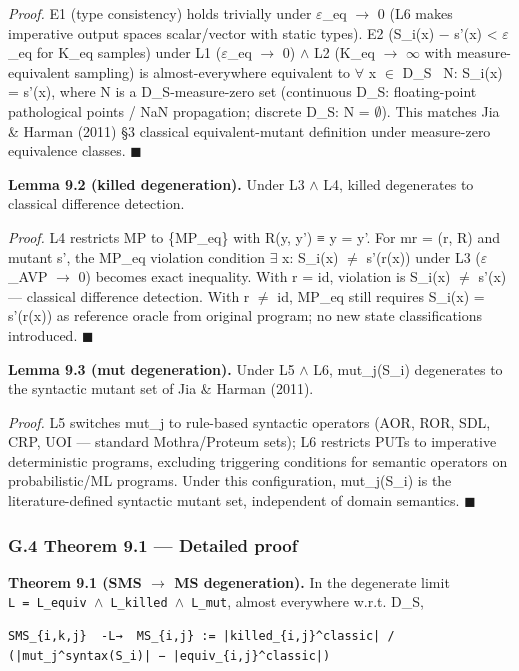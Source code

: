 \documentclass[review,12pt,authoryear]{elsarticle}
\begin{document}
\emph{Proof.} E1 (type consistency) holds trivially under $\varepsilon$\_eq $\to$ 0 (L6
makes imperative output spaces scalar/vector with static types). E2
(\textbar S\_i(x) − s'(x)\textbar{} \textless{} $\varepsilon$\_eq for K\_eq samples)
under L1 ($\varepsilon$\_eq $\to$ 0) $\wedge$ L2 (K\_eq $\to$ $\infty$ with measure-equivalent sampling)
is almost-everywhere equivalent to $\forall$ x $\in$ D\_S ~N: S\_i(x) = s'(x), where
N is a D\_S-measure-zero set (continuous D\_S: floating-point
pathological points / NaN propagation; discrete D\_S: N = $\emptyset$). This
matches Jia \& Harman (2011) §3 classical equivalent-mutant definition
under measure-zero equivalence classes. $\blacksquare$

\textbf{Lemma 9.2 (killed degeneration).} Under L3 $\wedge$ L4, killed
degenerates to classical difference detection.

\emph{Proof.} L4 restricts MP to \{MP\_eq\} with R(y, y') ≡ y = y'. For
mr = (r, R) and mutant s', the MP\_eq violation condition $\exists$ x: S\_i(x) $\neq$
s'(r(x)) under L3 ($\varepsilon$\_AVP $\to$ 0) becomes exact inequality. With r = id,
violation is S\_i(x) $\neq$ s'(x) --- classical difference detection. With r
$\neq$ id, MP\_eq still requires S\_i(x) = s'(r(x)) as reference oracle from
original program; no new state classifications introduced. $\blacksquare$

\textbf{Lemma 9.3 (mut degeneration).} Under L5 $\wedge$ L6, mut\_j(S\_i)
degenerates to the syntactic mutant set of Jia \& Harman (2011).

\emph{Proof.} L5 switches mut\_j to rule-based syntactic operators (AOR,
ROR, SDL, CRP, UOI --- standard Mothra/Proteum sets); L6 restricts PUTs
to imperative deterministic programs, excluding triggering conditions
for semantic operators on probabilistic/ML programs. Under this
configuration, mut\_j(S\_i) is the literature-defined syntactic mutant
set, independent of domain semantics. $\blacksquare$

\subsubsection{G.4 Theorem 9.1 --- Detailed
proof}\label{g.4-theorem-9.1-detailed-proof}

\textbf{Theorem 9.1 (SMS $\to$ MS degeneration).} In the degenerate limit
\texttt{L\ =\ L\_equiv\ $\wedge$\ L\_killed\ $\wedge$\ L\_mut}, almost everywhere
w.r.t. D\_S,

\begin{verbatim}
SMS_{i,k,j}  -L→  MS_{i,j} := |killed_{i,j}^classic| / (|mut_j^syntax(S_i)| − |equiv_{i,j}^classic|)
\end{verbatim}
\end{document}
